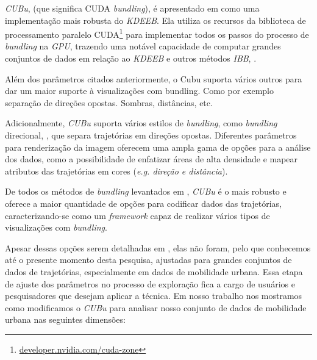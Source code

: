 \emph{CUBu}, (que significa CUDA \emph{bundling}), é apresentado em
\citet{zwan:16} como uma implementação mais robusta do \emph{KDEEB}. Ela
utiliza os recursos da biblioteca de processamento paralelo
CUDA\footnote{\url{developer.nvidia.com/cuda-zone}} para implementar todos os
passos do processo de \emph{bundling} na \emph{GPU}, trazendo uma notável
capacidade de computar grandes conjuntos de dados em relação ao \emph{KDEEB}
e outros métodos \emph{IBB}, \citet{adeb,lhuillier-fft:17}.

Além dos parâmetros citados anteriormente, o Cubu suporta vários
outros para dar um maior suporte à visualizações com bundling. Como por
exemplo separação de direções opostas. Sombras, distâncias, etc.

Adicionalmente, \emph{CUBu} suporta vários estilos de \emph{bundling},
como \emph{bundling} direcional, \citep{adeb}, que separa trajetórias
em direções opostas. Diferentes parâmetros para renderização da imagem oferecem
uma ampla gama de opções para a análise dos dados, como a possibilidade de
enfatizar áreas de alta densidade e mapear atributos das trajetórias
em cores (\emph{e.g. direção e distância}).
 
De todos os métodos de \emph{bundling} levantados em \cite{Lhuillier2017},
\emph{CUBu} é o mais robusto e oferece a maior quantidade de opções para codificar
dados das trajetórias, caracterizando-se como um \emph{framework} capaz de realizar
vários tipos de visualizações com \emph{bundling}.


Apesar dessas opções serem detalhadas em \cite{zwan:16},
elas não foram, pelo que conhecemos até o presente momento desta pesquisa, ajustadas para
grandes conjuntos de dados de trajetórias, especialmente em dados de mobilidade urbana.
Essa etapa de ajuste dos parâmetros no processo de exploração fica a cargo de usuários e pesquisadores
que desejam aplicar a técnica. Em nosso trabalho nos mostramos como modificamos
o \emph{CUBu} para analisar nosso conjunto de dados de mobilidade urbana nas seguintes
dimensões:

